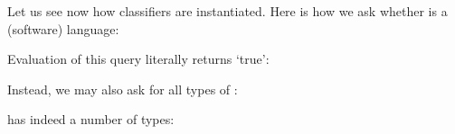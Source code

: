 \documentclass{llncs}
\begin{document}

\noindent
Let us see now how classifiers are instantiated. Here is how we ask
whether  is a (software) language:


\noindent
Evaluation of this query literally returns `true':


\noindent
Instead, we may also ask for all types of :


\noindent
{} has indeed a number of types:


\end{document}
